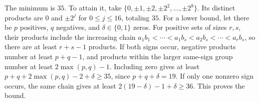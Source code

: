 The minimum is $\boxed{35}$. To attain it, take $\{0,\pm1,\pm2,\pm2^2,\ldots,\pm2^8\}$. Its distinct products are $0$ and $\pm2^j$ for $0\le j\le16$, totaling $35$. For a lower bound, let there be $p$ positives, $q$ negatives, and $\delta\in\{0,1\}$ zeros. For positive sets of sizes $r,s$, their products include the increasing chain $a_1b_1<\cdots<a_1b_s<a_2b_s<\cdots<a_rb_s$, so there are at least $r+s-1$ products. If both signs occur, negative products number at least $p+q-1$, and products within the larger same-sign group number at least $2\max(p,q)-1$. Including zero gives at least $p+q+2\max(p,q)-2+\delta\ge35$, since $p+q+\delta=19$. If only one nonzero sign occurs, the same chain gives at least $2(19-\delta)-1+\delta\ge36$. This proves the bound.
